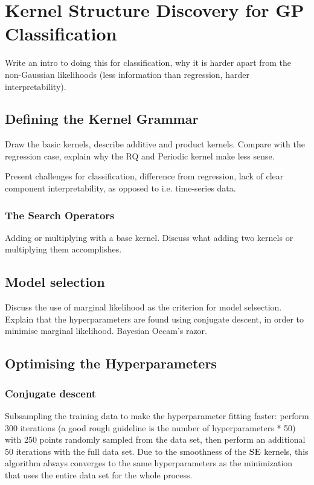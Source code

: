\documentclass[a4paper,12pt ]{report}
\begin{document}
\clearpage

\chapter{Kernel Structure Discovery for GP Classification} 

Write an intro to doing this for classification, why it is harder apart from the non-Gaussian likelihoods (less information than regression, harder interpretability). 

\section{Defining the Kernel Grammar}

Draw the basic kernels, describe additive and product kernels. Compare with the regression case, explain why the RQ and Periodic kernel make less sense. 

Present challenges for classification, difference from regression, lack of clear component interpretability, as opposed to i.e. time-series data. 

\subsection{The Search Operators}

Adding or multiplying with a base kernel. Discuss what adding two kernels or multiplying them accomplishes. 

\section{Model selection}

Discuss the use of marginal likelihood as the criterion for model selsection. Explain that the hyperparameters are found using conjugate descent, in order to minimise marginal likelihood. Bayesian Occam's razor. 

\clearpage

\section{Optimising the Hyperparameters}

\subsection{Conjugate descent}

Subsampling the training data to make the hyperparameter fitting faster: perform 300 iterations (a good rough guideline is the number of hyperparameters * 50) with 250 points randomly sampled from the data set, then perform an additional 50 iterations with the full data set. 
Due to the smoothness of the $\textsc{SE}$ kernels, this algorithm always converges to the same hyperparameters as the minimization that uses the entire data set for the whole process. 
\end{document}
